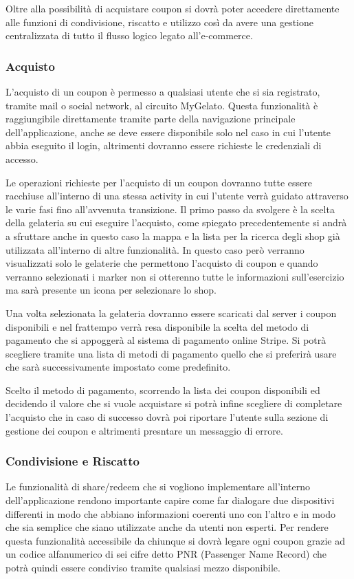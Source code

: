 Oltre alla possibilità di acquistare coupon si dovrà poter accedere direttamente alle funzioni di condivisione, riscatto e utilizzo così da avere una gestione centralizzata di tutto il flusso logico legato all'e-commerce.

\subsubsection{Acquisto}
L'acquisto di un coupon è permesso a qualsiasi utente che si sia registrato, tramite mail o social network, al circuito MyGelato.
Questa funzionalità è raggiungibile direttamente tramite parte della navigazione principale dell'applicazione, anche se deve essere disponibile solo nel caso in cui l'utente abbia eseguito il login, altrimenti dovranno essere richieste le credenziali di accesso.

Le operazioni richieste per l'acquisto di un coupon dovranno tutte essere racchiuse all'interno di una stessa activity in cui l'utente verrà guidato attraverso le varie fasi fino all'avvenuta transizione.
Il primo passo da svolgere è la scelta della gelateria su cui eseguire l'acquisto, come spiegato precedentemente si andrà a sfruttare anche in questo caso la mappa e la lista per la ricerca degli shop già utilizzata all'interno di altre funzionalità.
In questo caso però verranno visualizzati solo le gelaterie che permettono l'acquisto di coupon e quando verranno selezionati i marker non si otterenno tutte le informazioni sull'esercizio ma sarà presente un icona per selezionare lo shop.

Una volta selezionata la gelateria dovranno essere scaricati dal server i coupon disponibili e nel frattempo verrà resa disponibile la scelta del metodo di pagamento che si appoggerà al sistema di pagamento online Stripe.
Si potrà scegliere tramite una lista di metodi di pagamento quello che si preferirà usare che sarà successivamente impostato come predefinito.

Scelto il metodo di pagamento, scorrendo la lista dei coupon disponibili ed decidendo il valore che si vuole acquistare si potrà infine scegliere di completare l'acquisto che in caso di successo dovrà poi riportare l'utente sulla sezione di gestione dei coupon e altrimenti presntare un messaggio di errore.

\subsubsection{Condivisione e Riscatto}
Le funzionalità di share/redeem che si vogliono implementare all'interno dell'applicazione rendono importante capire come far dialogare due dispositivi differenti in modo che abbiano informazioni coerenti uno con l'altro e in modo che sia semplice che siano utilizzate anche da utenti non esperti.
Per rendere questa funzionalità accessibile da chiunque si dovrà legare ogni coupon grazie ad un codice alfanumerico di sei cifre detto PNR (Passenger Name Record) che potrà quindi essere condiviso tramite qualsiasi mezzo disponibile.


